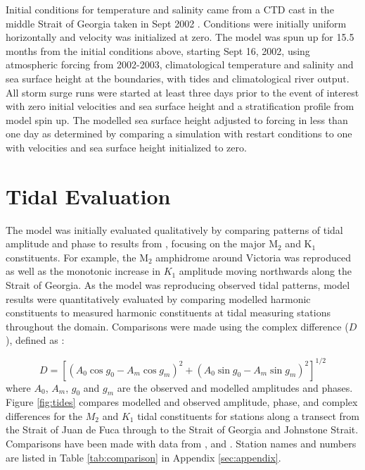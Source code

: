 \documentclass[letterpaper]{tATO2e}
\begin{document}
Initial conditions for temperature and salinity came from a CTD cast in the middle Strait of Georgia taken in Sept 2002 \citep{pawlowiczetal2007}. Conditions were initially uniform horizontally and velocity was initialized at zero. The model was spun up for 15.5 months from the initial conditions above, starting Sept 16, 2002, using atmospheric forcing from 2002-2003, climatological temperature and salinity and sea surface height at the boundaries, with tides and climatological river output.  All storm surge runs were started at least three days prior to the event of interest with zero initial velocities and sea surface height and a stratification profile from model spin up. {\color{red} The modelled sea surface height adjusted to forcing in less than one day as determined by comparing a simulation with restart conditions to one with velocities and sea surface height initialized to zero}. 

\section{Tidal Evaluation}\label{sec:model}

The model was initially evaluated qualitatively by comparing patterns of tidal amplitude and phase to results from \citet{foreman1995tidal}, focusing on the major M$_2$ and K$_1$ constituents. For example, the M$_2$ amphidrome around Victoria was reproduced as well as the monotonic increase in $K_1$ amplitude moving northwards along the Strait of Georgia. As the model was reproducing observed tidal patterns, model results were quantitatively evaluated by comparing modelled harmonic constituents to measured harmonic constituents at tidal measuring stations throughout the domain. Comparisons were made using the complex difference ($D$), defined as \citep{foreman1995tidal}:

\begin{equation}
D = [(A_0 \cos g_0 - A_m \cos g_m)^2 + (A_0 \sin g_0 - A_m \sin g_m)^2]^{1/2}
\end{equation}\label{eq:compdiff}
where $A_0$, $A_m$, $g_0$ and $g_m$ are the observed and modelled amplitudes and phases. Figure \ref{fig:tides} compares modelled and observed amplitude, phase, and complex differences for the $M_2$ and $K_1$ tidal constituents for stations along a transect from the Strait of Juan de Fuca through to the Strait of Georgia and Johnstone Strait. Comparisons have been made with data from \citet{foreman1995tidal}, \citet{foreman2004m} and \citet{foreman2012circulation}. Station names and numbers are listed in Table  \ref{tab:comparison} in Appendix \ref{sec:appendix}.
\end{document}
